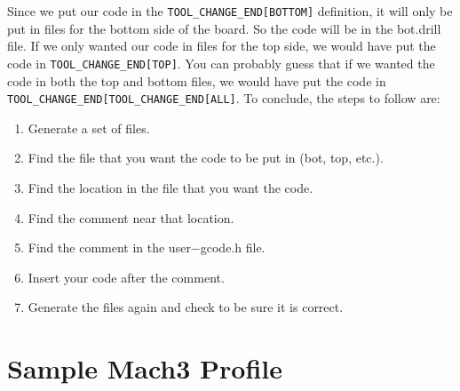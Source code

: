 \documentclass[11pt]{book}
\begin{document}
Since we put our code in the \lstinline!TOOL_CHANGE_END[BOTTOM]! definition, it will only be put in files for the bottom side of the board. So the code will be in the bot.drill file. If we only wanted our code in files for the top side, we would have put the code in \lstinline!TOOL_CHANGE_END[TOP]!. You can probably guess that if we wanted the code in both the top and bottom files, we would have put the code in \lstinline!TOOL_CHANGE_END[TOOL_CHANGE_END[ALL]!.
To conclude, the steps to follow are:
\begin{enumerate}

\item Generate a set of files.
\item Find the file that you want the code to be put in (bot, top, etc.).
\item Find the location in the file that you want the code.
\item Find the comment near that location.
\item Find the comment in the user−gcode.h file.
\item Insert your code after the comment.
\item Generate the files again and check to be sure it is correct.
\end{enumerate}

%
%
%

\appendix
\chapter{Sample Mach3 Profile}\label{chp:SampleProfile}
\end{document}
